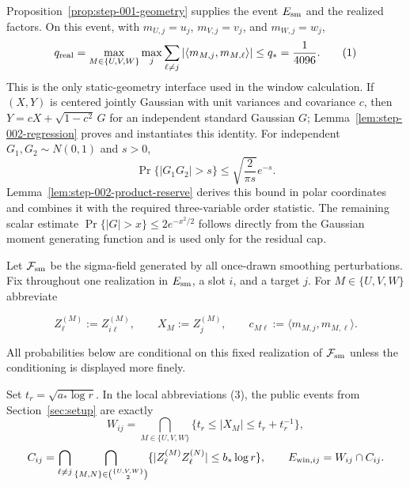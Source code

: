 Proposition~\ref{prop:step-001-geometry} supplies the event $E_{\rm sm}$ and
the realized factors. On this event, with
$m_{U,j}=u_j$, $m_{V,j}=v_j$, and $m_{W,j}=w_j$,
\[
q_{\rm real}
=\max_{M\in\{U,V,W\}}\max_j
 \sum_{\ell\ne j}|\langle m_{M,j},m_{M,\ell}\rangle|
\le q_*=\frac1{4096}.
\tag{1}
\]
This is the only static-geometry interface used in the window calculation.
If $(X,Y)$ is centered jointly Gaussian with unit variances and covariance
$c$, then $Y=cX+\sqrt{1-c^2}\,G$ for an independent standard Gaussian $G$;
Lemma~\ref{lem:step-002-regression} proves and instantiates this identity.
For independent $G_1,G_2\sim N(0,1)$ and $s>0$,
\[
\Pr\{|G_1G_2|>s\}\le \sqrt{\frac{2}{\pi s}}e^{-s}.
\tag{2}
\]
Lemma~\ref{lem:step-002-product-reserve} derives this bound in polar
coordinates and combines it with the required three-variable order statistic.
The remaining scalar estimate
$\Pr\{|G|>x\}\le2e^{-x^2/2}$ follows directly from the Gaussian moment
generating function and is used only for the residual cap.

Let $\mathcal F_{\rm sm}$ be the sigma-field generated by all once-drawn
smoothing perturbations. Fix throughout one realization in $E_{\rm sm}$, a
slot $i$, and a target $j$. For $M\in\{U,V,W\}$ abbreviate

\[
Z_{\ell}^{(M)}:=Z_{i\ell}^{(M)},\qquad
X_M:=Z_j^{(M)},\qquad
c_{M\ell}:=\langle m_{M,j},m_{M,\ell}\rangle .
\tag{3}
\]

All probabilities below are conditional on this fixed realization of
$\mathcal F_{\rm sm}$ unless the conditioning is displayed more finely.

Set $t_r=\sqrt{a_*\log r}$. In the local abbreviations (3), the public
events from Section~\ref{sec:setup} are exactly
\[
W_{ij}=\bigcap_{M\in\{U,V,W\}}
\{t_r\le|X_M|\le t_r+t_r^{-1}\},
\]
\[
C_{ij}=\bigcap_{\ell\ne j}
\bigcap_{\{M,N\}\in\binom{\{U,V,W\}}2}
\{|Z_{\ell}^{(M)}Z_{\ell}^{(N)}|\le b_*\log r\},
\qquad E_{{\rm win},ij}=W_{ij}\cap C_{ij}.
\]

